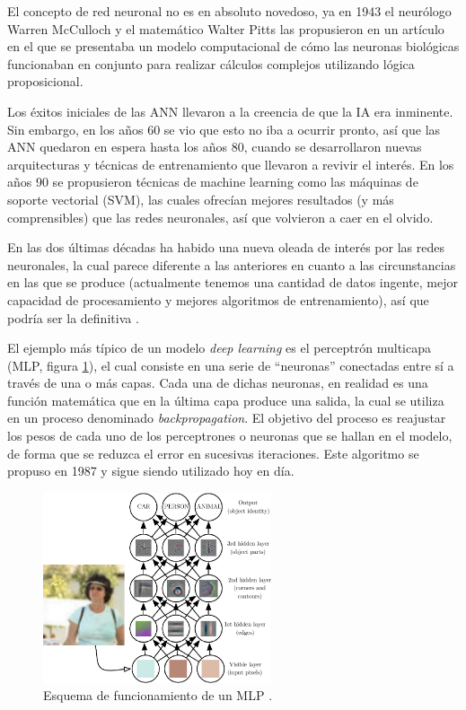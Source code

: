 El concepto de red neuronal no es en absoluto novedoso, ya en 1943 el neurólogo Warren McCulloch y el matemático Walter Pitts las propusieron en un artículo \cite{art:mcculloch1943logical} en el que se presentaba un modelo computacional de cómo las neuronas biológicas funcionaban en conjunto para realizar cálculos complejos utilizando lógica proposicional.

Los éxitos iniciales de las ANN llevaron a la creencia de que la IA era inminente. Sin embargo, en los años 60 se vio que esto no iba a ocurrir pronto, así que las ANN quedaron en espera hasta los años 80, cuando se desarrollaron nuevas arquitecturas y técnicas de entrenamiento que llevaron a revivir el interés. En los años 90 se propusieron técnicas de machine learning como las máquinas de soporte vectorial (SVM), las cuales ofrecían mejores resultados (y más comprensibles) que las redes neuronales, así que volvieron a caer en el olvido.

En las dos últimas décadas ha habido una nueva oleada de interés por las redes neuronales, la cual parece diferente a las anteriores en cuanto a las circunstancias en las que se produce (actualmente tenemos una cantidad de datos ingente, mejor capacidad de procesamiento y mejores algoritmos de entrenamiento), así que podría ser la definitiva \cite{book:homl}.

El ejemplo más típico de un modelo \textit{deep learning} es el perceptrón multicapa (MLP, figura \ref{fig:mlp}), el cual consiste en una serie de ``neuronas'' conectadas entre sí a través de una o más capas. Cada una de dichas neuronas, en realidad es una función matemática que en la última capa produce una salida, la cual se utiliza en un proceso denominado \textit{backpropagation}. El objetivo del proceso es reajustar los pesos de cada uno de los perceptrones o neuronas que se hallan en el modelo, de forma que se reduzca el error en sucesivas iteraciones. Este algoritmo se propuso en 1987 \cite{art:backpropagation} y sigue siendo utilizado hoy en día.

\begin{figure}[H]
  \centering
  \includegraphics[width=0.6\textwidth]{images/mlp}
  \caption{Esquema de funcionamiento de un MLP \cite{book:Goodfellow-et-al-2016}.}
  \label{fig:mlp}
\end{figure}

